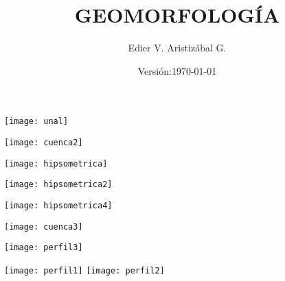 \documentclass{beamer}
\title[Ambiente Aluvial]{GEOMORFOLOGÍA}
\author[Edier Aristizabal]{Edier V. Aristizábal G.}
\institute{evaristizabalg@unal.edu.co}
\date{\tiny{Versión:\today}}
\begin{document}
\begin{frame}
\titlepage
\centering
   	\texttt{[image: unal]} 
\end{frame}
\begin{frame}
\begin{center}
   	\texttt{[image: cuenca2]}
\end{center}
\end{frame}
\begin{frame}
\begin{center}
   	\texttt{[image: hipsometrica]}
\end{center}
\end{frame}
\begin{frame}
\begin{center}
   	\texttt{[image: hipsometrica2]}
\end{center}
\end{frame}
\begin{frame}
\begin{center}
   	\texttt{[image: hipsometrica4]}
\end{center}
\end{frame}
\begin{frame}
\begin{center}
   	\texttt{[image: cuenca3]}
\end{center}
\end{frame}
\begin{frame}
\begin{center}
   	\texttt{[image: perfil3]}
\end{center}
\end{frame}
\begin{frame}
\begin{center}
   	\texttt{[image: perfil1]}
   	\texttt{[image: perfil2]}
\end{center}
\end{frame}
\end{document}
